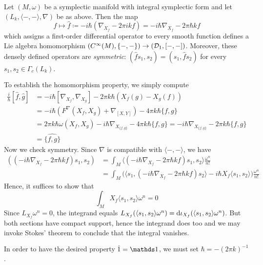 \documentclass[parskip=half]{scrartcl}
\begin{document}
\begin{prop}
	Let $(M,\omega)$ be a symplectic manifold with integral symplectic form and let $(L_k,\langle-,-\rangle,\nabla)$ be as above. Then the map
	\begin{equation*}
		f\longmapsto \hat f \coloneqq -i\hbar (\nabla_{X_f}-2\pi i k f)=-i\hbar \nabla_{X_f}-2\pi \hbar kf
	\end{equation*}
	which assigns a first-order differential operator to every smooth function defines a Lie algebra homomorphism $(C^\infty(M),\{-,-\})\to (\mathcal{D}_1,[-,-])$. Moreover, these densely defined operators are \emph{symmetric}: $(\hat f s_1,s_2)=(s_1,\hat f s_2)$ for every $s_1,s_2\in \Gamma_c(L_k)$.
\end{prop}
\begin{myproof}
	To establish the homomorphism property, we simply compute
	\begin{align*}
		\frac{i}{\hbar}[\hat f,\hat g]&=-i\hbar [\nabla_{X_f},\nabla_{X_g}]-2\pi k\hbar (X_f(g)-X_g(f))\\
		&=-i\hbar (F^\nabla(X_f,X_g)+\nabla_{[X,Y]})-4\pi k\hbar \{f,g\}\\
		&=2\pi k\hbar  \omega(X_f,X_g)-i\hbar \nabla_{X_{\{f,g\}}}-4\pi k\hbar \{f,g\}
		=-i\hbar \nabla_{X_{\{f,g\}}}-2\pi k\hbar \{f,g\}\\
		&=\widehat{\{f,g\}}
	\end{align*}
	Now we check symmetry. Since $\nabla$ is compatible with $\langle-,-\rangle$, we have 
	\begin{align*}
		((-i\hbar \nabla_{X_f}-2\pi \hbar k f)s_1,s_2)
		&=\int_M \langle (-i\hbar \nabla_{X_f}-2\pi \hbar k f)s_1,s_2\rangle \frac{\omega^n}{n!}\\
		&=\int_M \Big( \langle s_1,(-i\hbar \nabla_{X_f}-2\pi \hbar k f)s_2\rangle
		-i\hbar X_f\langle s_1,s_2\rangle\Big) \frac{\omega^n}{n!}
	\end{align*}
	Hence, it suffices to show that 
	\begin{equation*}
		\int_M X_f\langle s_1,s_2\rangle \omega^n=0
	\end{equation*}
	Since $L_{X_f}\omega^n=0$, the integrand equals $L_{X_f}(\langle s_1,s_2\rangle \omega^n)=\mathrm{d}\iota_{X_f}(\langle s_1,s_2\rangle \omega^n)$. But both sections have compact support, hence the integrand does too and we may invoke Stokes' theorem to conclude that the integral vanishes.
\end{myproof}

\begin{rem}
	In order to have the desired property $\hat 1=\Unit$, we must set $\hbar=-(2\pi k)^{-1}$.
\end{rem}
\end{document}
